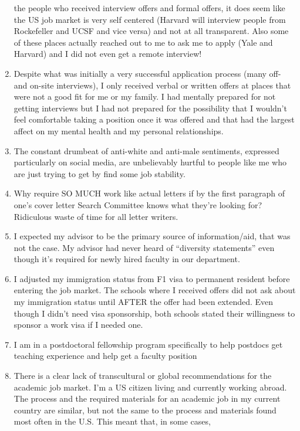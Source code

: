\documentclass[]{article}
\begin{document}
\begin{enumerate}
  the people who received interview offers and formal offers, it does
  seem like the US job market is very self centered (Harvard will
  interview people from Rockefeller and UCSF and vice versa) and not at
  all transparent. Also some of these places actually reached out to me
  to ask me to apply (Yale and Harvard) and I did not even get a remote
  interview!
\item
  Despite what was initially a very successful application process (many
  off- and on-site interviews), I only received verbal or written offers
  at places that were not a good fit for me or my family. I had mentally
  prepared for not getting interviews but I had not prepared for the
  possibility that I wouldn't feel comfortable taking a position once it
  was offered and that had the largest affect on my mental health and my
  personal relationships.
\item
  The constant drumbeat of anti-white and anti-male sentiments,
  expressed particularly on social media, are unbelievably hurtful to
  people like me who are just trying to get by find some job stability.
\item
  Why require SO MUCH work like actual letters if by the first paragraph
  of one's cover letter Search Committee knows what they're looking for?
  Ridiculous waste of time for all letter writers.
\item
  I expected my advisor to be the primary source of information/aid,
  that was not the case. My advisor had never heard of ``diversity
  statements'' even though it's required for newly hired faculty in our
  department.
\item
  I adjusted my immigration status from F1 visa to permanent resident
  before entering the job market. The schools where I received offers
  did not ask about my immigration status until AFTER the offer had been
  extended. Even though I didn't need visa sponsorship, both schools
  stated their willingness to sponsor a work visa if I needed one.
\item
  I am in a postdoctoral fellowship program specifically to help
  postdocs get teaching experience and help get a faculty position
\item
  There is a clear lack of transcultural or global recommendations for
  the academic job market. I'm a US citizen living and currently working
  abroad. The process and the required materials for an academic job in
  my current country are similar, but not the same to the process and
  materials found most often in the U.S. This meant that, in some cases,

\end{enumerate}
\end{document}
